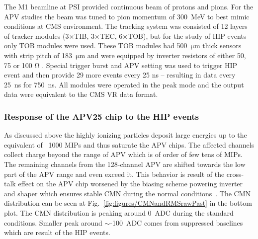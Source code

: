 The M1 beamline at PSI provided continuous beam of protons and pions. For the APV studies the beam was tuned to pion momentum of 300~MeV to best mimic conditions at CMS environment. The tracking system was consisted of 12 layers of tracker modules (3$\times$TIB, 3$\times$TEC, 6$\times$TOB), but for the study of HIP events only TOB modules were used. These TOB modules had 500~$\mathrm{\mu m}$ thick sensors with strip pitch of 183~$\mathrm{\mu}$m and were equipped by inverter resistors of either 50, 75 or 100 $\mathrm{\Omega}$ . Special trigger burst and APV setting was used to trigger HIP event and then provide 29 more events every 25 ns -- resulting in data every 25~ns for 750~ns. All modules were operated in the peak mode and the output data were equivalent to the CMS VR data format. 




\subsubsection{Response of the APV25 chip to the HIP events}

As discussed above the highly ionizing particles deposit large energies up to the equivalent of ~1000 MIPs and thus saturate the APV chips. The affected channels collect charge beyond the range of APV which is of order of few tens of MIPs. The remaining channels from the 128-channel APV are shifted towards the low part of the APV range and even exceed it. This behavior is result of the cross-talk effect on the APV chip worsened by the biasing scheme powering inverter and shaper which ensures stable CMN during the normal conditions~\cite{Bainbridge:2004jc}. The CMN distribution can be seen at Fig.~\ref{fig:figures/CMNandRMSrawPast} in the bottom plot. The CMN distribution is peaking around 0~ADC during the standard conditions. Smaller peak around $\sim$-100~ADC comes from suppressed baselines which are result of the HIP events. 

